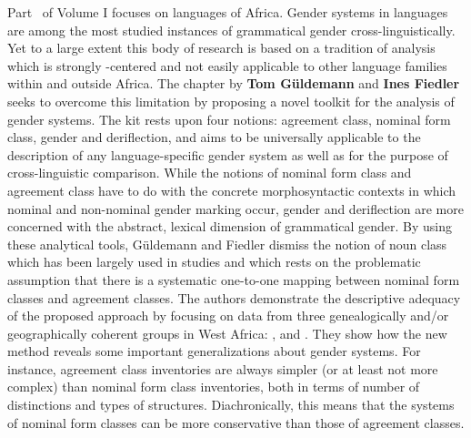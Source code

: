 \documentclass[output=collectionpaper]{langsci/langscibook}
\begin{document}
Part~\ptafrica{} of Volume I focuses on languages of Africa. Gender systems in  languages are among the most studied instances of grammatical gender cross-linguistically. Yet to a large extent this body of research is based on a tradition of analysis which is strongly -centered and not easily applicable to other language families within and outside Africa. The chapter by \textbf{Tom Güldemann} and \textbf{Ines Fiedler} seeks to overcome this limitation by proposing a novel toolkit for the analysis of  gender systems. The kit rests upon four notions: agreement class, nominal form class, gender and deriflection, and aims to be universally applicable to the description of any language-specific gender system as well as for the purpose of cross-linguistic comparison. While the notions of nominal form class and agreement class have to do with the concrete morphosyntactic contexts in which nominal and non-nominal gender marking occur, gender and deriflection are more concerned with the abstract, lexical dimension of grammatical gender. By using these analytical tools, Güldemann and Fiedler dismiss the notion of noun class which has been largely used in  studies and which rests on the problematic assumption that there is a systematic one-to-one mapping between nominal form classes and agreement classes. The authors demonstrate the descriptive adequacy of the proposed approach by focusing on data from three genealogically and/or geographically coherent  groups in West Africa: ,  and . They show how the new method reveals some important generalizations about  gender systems. For instance, agreement class inventories are always simpler (or at least not more complex) than nominal form class inventories, both in terms of number of distinctions and types of structures. Diachronically, this means that the systems of nominal form classes can be more conservative than those of agreement classes.
\end{document}
